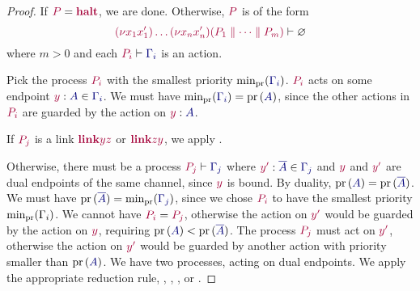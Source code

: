 \begin{proof}
  \label{prf:thm-pcp-closed-progress}
  If $\tm{P}=\tm{\halt}$, we are done. Otherwise, $\tm{P}$ is of the form
  \[
    \seq{\res{x_1}{x'_1}{\dots\res{x_n}{x'_n}{(P_1 \parallel\dots\parallel P_m)}}}{\emptyenv}
  \]
  where $m>0$ and each $\seq{P_i}{\ty{\Gamma_i}}$ is an action.

  Pick the process $\tm{P_i}$ with the smallest priority $\minpr{(\ty{\Gamma_i})}$. $\tm{P_i}$ acts on some endpoint $\tmty{y}{A}\in\ty{\Gamma_i}$. We must have $\minpr{(\ty{\Gamma_i})}=\pr{(\ty{A})}$, since the other actions in $\tm{P_i}$ are guarded by the action on $\tmty{y}{A}$.

  If $\tm{P_j}$ is a link $\tm{\link{y}{z}}$ or $\tm{\link{z}{y}}$, we apply .

  Otherwise, there must be a process $\seq{P_j}{\ty{\Gamma_j}}$ where $\tmty{y'}{\co{A}}\in\ty{\Gamma_j}$ and $\tm{y}$ and $\tm{y'}$ are dual endpoints of the same channel, since $\tm{y}$ is bound. By duality, $\pr{(\ty{A})}=\pr{(\ty{\co{A}})}$. We must have $\pr{(\ty{\co{A}})}=\minpr{(\ty{\Gamma_j})}$, since we chose $\tm{P_i}$ to have the smallest priority $\text{min}_{\operatorname{pr}}{(\Gamma_i)}$. We cannot have $\tm{P_i}=\tm{P_j}$, otherwise the action on $\tm{y'}$ would be guarded by the action on $\tm{y}$, requiring $\pr{(\ty{A})}<\pr{(\ty{\co{A}})}$. The process $\tm{P_j}$ must act on $\tm{y'}$, otherwise the action on $\tm{y'}$ would be guarded by another action with priority smaller than $\pr{(\ty{A})}$. We have two processes, acting on dual endpoints. We apply the appropriate reduction rule, \ie {}, , , or .
\end{proof}

